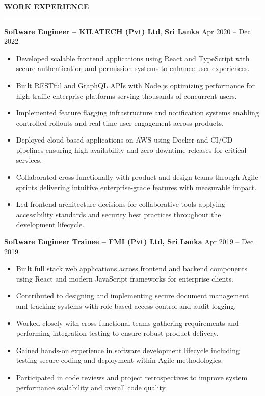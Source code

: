 \documentclass[10pt,letterpaper]{article}
\begin{document}
\vspace{8pt}

\textbf{WORK EXPERIENCE}\\[-8pt]
\noindent\rule{\textwidth}{1pt}

\vspace{-2pt}

\textbf{Software Engineer -- KILATECH (Pvt) Ltd}, \textbf{Sri Lanka} \hfill Apr 2020 -- Dec 2022

\vspace{-1pt}

\begin{itemize}
\item Developed scalable frontend applications using React and TypeScript with secure authentication and permission systems to enhance user experiences.
\item Built RESTful and GraphQL APIs with Node.js optimizing performance for high-traffic enterprise platforms serving thousands of concurrent users.
\item Implemented feature flagging infrastructure and notification systems enabling controlled rollouts and real-time user engagement across products.
\item Deployed cloud-based applications on AWS using Docker and CI/CD pipelines ensuring high availability and zero-downtime releases for critical services.
\item Collaborated cross-functionally with product and design teams through Agile sprints delivering intuitive enterprise-grade features with measurable impact.
\item Led frontend architecture decisions for collaborative tools applying accessibility standards and security best practices throughout the development lifecycle.
\end{itemize}

\textbf{Software Engineer Trainee -- FMI (Pvt) Ltd, Sri Lanka} \hfill Apr 2019 -- Dec 2019

\vspace{-1pt}

\begin{itemize}
\item Built full stack web applications across frontend and backend components using React and modern JavaScript frameworks for enterprise clients.
\item Contributed to designing and implementing secure document management and tracking systems with role-based access control and audit logging.
\item Worked closely with cross-functional teams gathering requirements and performing integration testing to ensure robust product delivery.
\item Gained hands-on experience in software development lifecycle including testing secure coding and deployment within Agile methodologies.
\item Participated in code reviews and project retrospectives to improve system performance scalability and overall code quality.
\end{itemize}
\end{document}
